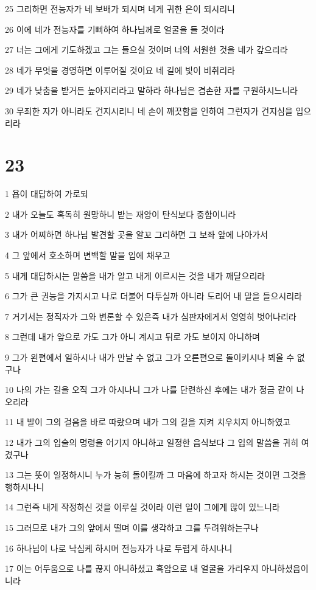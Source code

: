\par 25 그리하면 전능자가 네 보배가 되시며 네게 귀한 은이 되시리니
\par 26 이에 네가 전능자를 기뻐하여 하나님께로 얼굴을 들 것이라
\par 27 너는 그에게 기도하겠고 그는 들으실 것이며 너의 서원한 것을 네가 갚으리라
\par 28 네가 무엇을 경영하면 이루어질 것이요 네 길에 빛이 비취리라
\par 29 네가 낮춤을 받거든 높아지리라고 말하라 하나님은 겸손한 자를 구원하시느니라
\par 30 무죄한 자가 아니라도 건지시리니 네 손이 깨끗함을 인하여 그런자가 건지심을 입으리라

\chapter{23}

\par 1 욥이 대답하여 가로되
\par 2 내가 오늘도 혹독히 원망하니 받는 재앙이 탄식보다 중함이니라
\par 3 내가 어찌하면 하나님 발견할 곳을 알꼬 그리하면 그 보좌 앞에 나아가서
\par 4 그 앞에서 호소하며 변백할 말을 입에 채우고
\par 5 내게 대답하시는 말씀을 내가 알고 내게 이르시는 것을 내가 깨달으리라
\par 6 그가 큰 권능을 가지시고 나로 더불어 다투실까 아니라 도리어 내 말을 들으시리라
\par 7 거기서는 정직자가 그와 변론할 수 있은즉 내가 심판자에게서 영영히 벗어나리라
\par 8 그런데 내가 앞으로 가도 그가 아니 계시고 뒤로 가도 보이지 아니하며
\par 9 그가 왼편에서 일하시나 내가 만날 수 없고 그가 오른편으로 돌이키시나 뵈올 수 없구나
\par 10 나의 가는 길을 오직 그가 아시나니 그가 나를 단련하신 후에는 내가 정금 같이 나오리라
\par 11 내 발이 그의 걸음을 바로 따랐으며 내가 그의 길을 지켜 치우치지 아니하였고
\par 12 내가 그의 입술의 명령을 어기지 아니하고 일정한 음식보다 그 입의 말씀을 귀히 여겼구나
\par 13 그는 뜻이 일정하시니 누가 능히 돌이킬까 그 마음에 하고자 하시는 것이면 그것을 행하시나니
\par 14 그런즉 내게 작정하신 것을 이루실 것이라 이런 일이 그에게 많이 있느니라
\par 15 그러므로 내가 그의 앞에서 떨며 이를 생각하고 그를 두려워하는구나
\par 16 하나님이 나로 낙심케 하시며 전능자가 나로 두렵게 하시나니
\par 17 이는 어두움으로 나를 끊지 아니하셨고 흑암으로 내 얼굴을 가리우지 아니하셨음이니라

